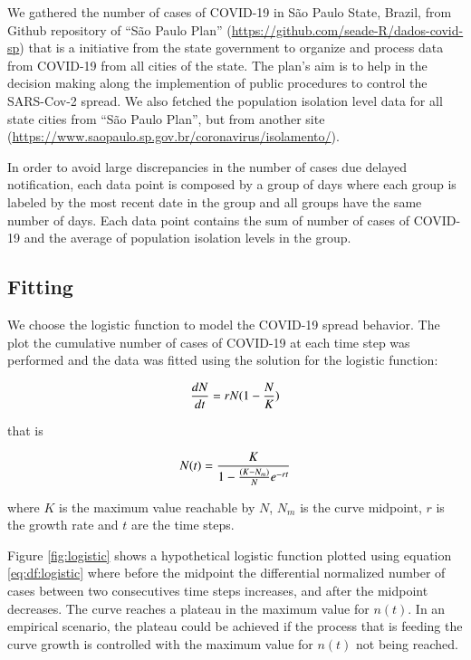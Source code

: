 \documentclass[review]{elsarticle}
\begin{document}
We gathered the number of cases of COVID-19 in S\~{a}o Paulo State, Brazil, from Github 
repository of ``S\~{a}o Paulo Plan'' (\url{https://github.com/seade-R/dados-covid-sp}) 
that is a initiative from the state government to organize and process data from COVID-19 
from all cities of the state. 
The plan's aim is to help in the decision making along the implemention of public 
procedures to control the SARS-Cov-2 spread. 
We also fetched the population isolation level data 
for all state cities  from 
``S\~{a}o Paulo Plan'', but from another site (\url{https://www.saopaulo.sp.gov.br/coronavirus/isolamento/}).

In order to avoid large discrepancies in the number of cases due delayed notification, 
 each data point is composed by a group of days where each group is labeled by the most 
 recent date in the group and all groups have the same number of days. 
 Each data point contains the sum of number of cases of {COVID-19} and 
 the average of population isolation levels 
 in the group.

\subsection{Fitting}

We choose the logistic function to model the COVID-19 spread behavior. 
The plot the cumulative number of cases of COVID-19 at each time step 
was performed and the data was fitted using the solution for the logistic function:

\begin{equation}
{dN \over dt} = r N (1 - {N \over K})
\label{eq:df:logistic}
\end{equation}

\noindent that is

\begin{equation}
N(t) = {K \over {1- {(K-N_{m}) \over N} e^{-rt}}}
\label{eq:exp:logistic}
\end{equation}

\noindent where $K$ is the maximum value reachable by $N$, 
$N_m$ is the curve midpoint, 
$r$ is the growth rate 
and $t$ are the time steps.

Figure \ref{fig:logistic} shows a hypothetical logistic function 
plotted using equation \ref{eq:df:logistic} where before the midpoint 
the differential normalized number of cases between 
two consecutives time steps increases, 
and after the midpoint decreases. 
The curve reaches a plateau in the maximum value for $n(t)$. 
In an empirical scenario, the plateau could be achieved 
if the process that is feeding the curve 
growth is controlled with the maximum 
value for $n(t)$ not being reached.
\end{document}

